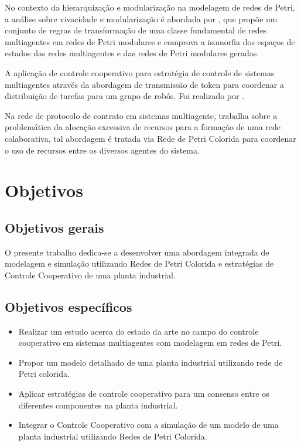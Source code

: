 No contexto da hierarquização e modularização na modelagem de redes de Petri, a análise sobre vivacidade e modularização é abordada por \cite{modular2013}, que propõe um conjunto de regras de transformação de uma classe fundamental de redes multiagentes em redes de Petri modulares e comprova a isomorfia dos espaços de estados das redes multiagentes e das redes de Petri modulares geradas.

A aplicação de controle cooperativo para estratégia de controle de sistemas multiagentes através da abordagem de transmissão de token para coordenar a distribuição de tarefas para um grupo de robôs. Foi realizado por  \cite{token2006}.

Na rede de protocolo de contrato em sistemas multiagente, \cite{contract2009} trabalha sobre a problemática da alocação excessiva de recursos para a formação de uma rede colaborativa, tal abordagem é tratada via Rede de Petri Colorida para coordenar o uso de recursos entre os diversos agentes do sistema.




\section{Objetivos}
\subsection{Objetivos gerais}
 O presente trabalho dedica-se a desenvolver uma abordagem integrada de modelagem e simulação utilizando Redes de Petri Colorida e estratégias de Controle Cooperativo de uma planta industrial.

\subsection{Objetivos específicos}
\begin{itemize}[]
    \item {Realizar um estudo acerca do estado da arte no campo do controle cooperativo em sistemas multiagentes com modelagem em redes de Petri.}
    
    \item {Propor um modelo detalhado de uma planta industrial utilizando rede de Petri colorida.}
    
    \item {Aplicar estratégias de controle cooperativo para um consenso entre os diferentes componentes na planta industrial.}

    \item {Integrar  o  Controle Cooperativo com a  simulação de um modelo de uma planta industrial utilizando Redes de Petri Colorida.} 
\end{itemize}


